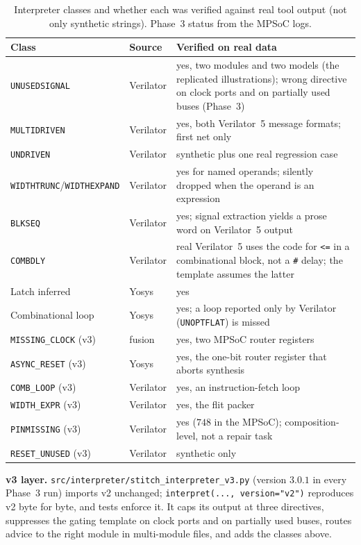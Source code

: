 \documentclass[11pt]{article}
\newcommand{\cond}[1]{\texttt{#1}}
\begin{document}
\begin{table}[htbp]
\centering
\caption{Interpreter classes and whether each was verified against real tool
output (not only synthetic strings). Phase~3 status from the MPSoC logs.}
\label{tab:s-rules}
\small
\begin{tabularx}{\linewidth}{@{}l l X@{}}
\toprule
\textbf{Class} & \textbf{Source} & \textbf{Verified on real data} \\
\midrule
\cond{UNUSEDSIGNAL} & Verilator & yes, two modules and two models (the replicated illustrations); wrong directive on clock ports and on partially used buses (Phase~3) \\
\cond{MULTIDRIVEN} & Verilator & yes, both Verilator~5 message formats; first net only \\
\cond{UNDRIVEN} & Verilator & synthetic plus one real regression case \\
\cond{WIDTHTRUNC}/\cond{WIDTHEXPAND} & Verilator & yes for named operands; silently dropped when the operand is an expression \\
\cond{BLKSEQ} & Verilator & yes; signal extraction yields a prose word on Verilator~5 output \\
\cond{COMBDLY} & Verilator & real Verilator~5 uses the code for \texttt{<=} in a combinational block, not a \texttt{\#} delay; the template assumes the latter \\
Latch inferred & Yosys & yes \\
Combinational loop & Yosys & yes; a loop reported only by Verilator (\cond{UNOPTFLAT}) is missed \\
\midrule
\cond{MISSING\_CLOCK} (v3) & fusion & yes, two MPSoC router registers \\
\cond{ASYNC\_RESET} (v3) & Yosys & yes, the one-bit router register that aborts synthesis \\
\cond{COMB\_LOOP} (v3) & Verilator & yes, an instruction-fetch loop \\
\cond{WIDTH\_EXPR} (v3) & Verilator & yes, the flit packer \\
\cond{PINMISSING} (v3) & Verilator & yes ($748$ in the MPSoC); composition-level, not a repair task \\
\cond{RESET\_UNUSED} (v3) & Verilator & synthetic only \\
\bottomrule
\end{tabularx}
\end{table}

\textbf{v3 layer.} \texttt{src/interpreter/stitch\_interpreter\_v3.py} (version
$3.0.1$ in every Phase~3 run) imports v2 unchanged; \texttt{interpret(...,
version="v2")} reproduces v2 byte for byte, and tests enforce it. It caps its
output at three directives, suppresses the gating template on clock ports and
on partially used buses, routes advice to the right module in multi-module
files, and adds the classes above.
\end{document}
